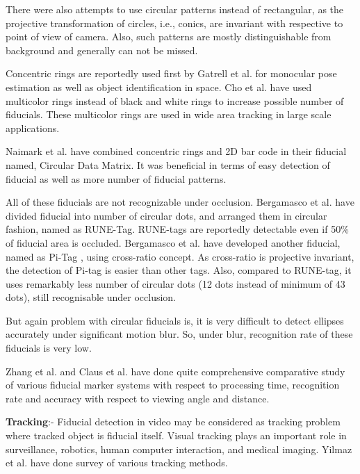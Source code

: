 \documentclass[runningheads]{llncs}
\begin{document}
There were also attempts to use circular patterns instead of rectangular, as
the projective transformation of circles, i.e., conics, are invariant with
respective to point of view of camera\cite{runetag11}. Also, such patterns are
mostly distinguishable from background and generally can not be missed.

Concentric rings are reportedly used first by Gatrell et al.\cite{concentric}
for monocular pose estimation as well as object identification in space. Cho et al.
\cite{Cho:2001,Cho97fastcolor} have used multicolor rings instead of
black and white rings\cite{concentric} to increase possible number of fiducials.
These multicolor rings are used in wide area tracking in large scale
applications.

Naimark et al. \cite{NaimarkF02} have combined concentric rings and 2D bar code
in their fiducial named, Circular Data Matrix. It was beneficial in terms of
easy detection of fiducial as well as more number of fiducial patterns.

All of these fiducials are not recognizable under occlusion.
Bergamasco et al. \cite{runetag11} have divided fiducial into number of
circular dots, and arranged them in circular fashion, named as RUNE-Tag.
RUNE-tags are reportedly detectable even if 50\% of fiducial area is occluded.
Bergamasco et al. have developed another fiducial, named as Pi-Tag
\cite{Pitag13}, using cross-ratio concept. As cross-ratio is projective
invariant, the detection of Pi-tag is easier than other tags. Also, compared
to RUNE-tag, it uses remarkably less number of circular dots (12 dots instead of
minimum of 43 dots), still recognisable under occlusion.

But again problem with circular fiducials is, it is very difficult to detect
ellipses accurately under significant motion blur. So, under blur, recognition
rate of these fiducials is very low.

Zhang et al.\cite{Zhang:2002} and Claus et al. \cite{ClausF04} have done
quite comprehensive comparative study of various fiducial marker systems with
respect to processing time, recognition rate and accuracy with
respect to viewing angle and distance.

\textbf{Tracking}:-
Fiducial detection in video may be considered as tracking problem where tracked
object is fiducial itself. Visual tracking plays an important role in
surveillance, robotics, human computer interaction, and medical
imaging\cite{Yilmaz:2006}. Yilmaz et al.\cite{Yilmaz:2006} have done survey of
various tracking methods. 
\end{document}
